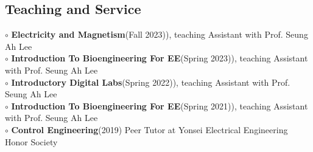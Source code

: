 \documentclass[a4paper,9pt]{extarticle}
\begin{document}
\begin{spacing}{1.05}

\section*{Teaching and Service}

\noindent $\circ$ \textbf{Electricity and Magnetism}(Fall 2023)), teaching Assistant with Prof. Seung Ah Lee\\
$\circ$ \textbf{Introduction To Bioengineering For EE}(Spring 2023)), teaching Assistant with Prof. Seung Ah Lee\\
$\circ$ \textbf{Introductory Digital Labs}(Spring 2022)), teaching Assistant with Prof. Seung Ah Lee\\
$\circ$ \textbf{Introduction To Bioengineering For EE}(Spring 2021)), teaching Assistant with Prof. Seung Ah Lee\\
$\circ$ \textbf{Control Engineering}(2019) Peer Tutor at Yonsei Electrical Engineering Honor Society







\end{spacing}
\end{document}
